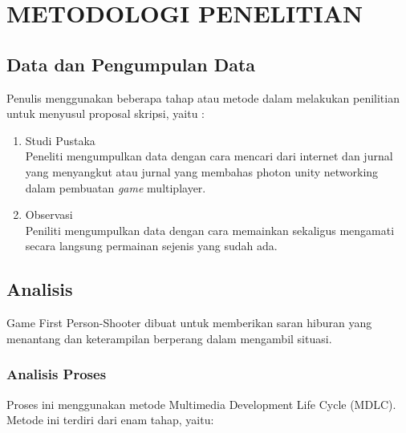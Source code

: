 \chapter{METODOLOGI PENELITIAN}
\noindent


\section{Data dan Pengumpulan Data}
\noindent

Penulis menggunakan beberapa tahap atau metode dalam melakukan penilitian untuk menyusul proposal skripsi, yaitu :

\begin{enumerate}
    \item Studi Pustaka \\ Peneliti mengumpulkan data dengan cara mencari dari internet dan jurnal yang menyangkut atau jurnal yang membahas photon unity networking dalam pembuatan \textit{game} multiplayer.
    \item Observasi \\ Peniliti mengumpulkan data dengan cara memainkan sekaligus mengamati secara langsung permainan sejenis yang sudah ada.
\end{enumerate}

\section{Analisis}
\noindent

Game First Person-Shooter dibuat untuk memberikan saran hiburan yang 
menantang dan keterampilan berperang dalam mengambil situasi.

\subsection{Analisis Proses}
\noindent

Proses ini menggunakan metode Multimedia Development Life Cycle 
(MDLC). Metode ini terdiri dari enam tahap, yaitu:

